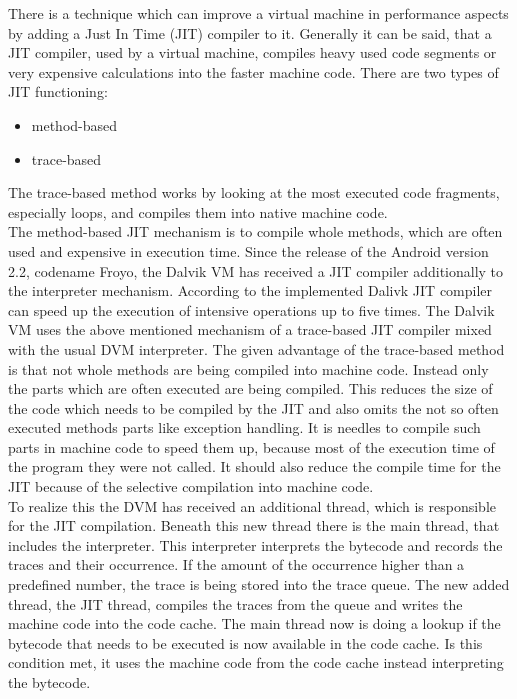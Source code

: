There is a technique which can improve a virtual machine in performance aspects by adding a Just In Time (JIT) compiler to it.
Generally it can be said, that a JIT compiler, used by a virtual machine, compiles heavy used code segments or very expensive calculations into the faster machine code.
There are two types of JIT functioning:
\begin{itemize}
\item method-based
\item trace-based
\end{itemize}
The trace-based method works by looking at the most executed code fragments, especially loops, and compiles them into native machine code.\\
The method-based JIT mechanism is to compile whole methods, which are often used and expensive in execution time.
Since the release of the Android version 2.2, codename Froyo, the Dalvik VM has received a JIT compiler additionally to the interpreter mechanism.
According to \cite{cheng2010jit} the implemented Dalivk JIT compiler can speed up the execution of intensive operations up to five times.
The Dalvik VM uses the above mentioned mechanism of a trace-based JIT compiler mixed with the usual DVM interpreter.
The given advantage of the trace-based method is that not whole methods are being compiled into machine code.
Instead only the parts which are often executed are being compiled.
This reduces the size of the code which needs to be compiled by the JIT and also omits the not so often executed methods parts like exception handling.
It is needles to compile such parts in machine code to speed them up, because most of the execution time of the program they were not called.
It should also reduce the compile time for the JIT because of the selective compilation into machine code.\\
To realize this the DVM has received an additional thread, which is responsible for the JIT compilation.
Beneath this new thread there is the main thread, that includes the interpreter.
This interpreter interprets the bytecode and records the traces and their occurrence.
If the amount of the occurrence higher than a predefined number, the trace is being stored into the trace queue.
The new added thread, the JIT thread, compiles the traces from the queue and writes the machine code into the code cache.
The main thread now is doing a lookup if the bytecode that needs to be executed is now available in the code cache.
Is this condition met, it uses the machine code from the code cache instead interpreting the bytecode.\cite{oh2012evaluation}
